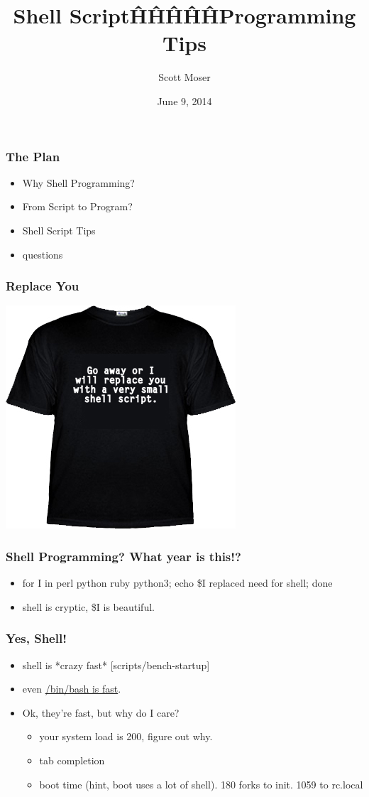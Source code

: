 \documentclass{beamer}
\author{Scott Moser}
\title{Shell Script\^H\^H\^H\^H\^HProgramming Tips}
\institute{Michigan!/usr/group}
\date{June 9, 2014}
\begin{document}
\begin{frame}[t,plain]
    \titlepage
\end{frame}

\begin{frame}
   \frametitle{The Plan}
   \begin{itemize}
      \item Why Shell Programming?
      \item From Script to Program?
      \item Shell Script Tips
      \item questions
   \end{itemize}
\end{frame}

\begin{frame}
   \frametitle{Replace You}
   \includegraphics{replace-you}
\end{frame}

\begin{frame}
   \frametitle{Shell Programming?  What year is this!?}
   \begin{itemize}
      \item for I in perl python ruby python3; echo \$I replaced need for shell; done
      \item shell is cryptic, \$I is beautiful.
   \end{itemize}
\end{frame}

\begin{frame}
   \frametitle{Yes, Shell!}
   \begin{itemize}
      \item shell is *crazy fast* [scripts/bench-startup]
      \item even \href{https://gist.github.com/smoser/9780744}{/bin/bash is fast}.
      \item Ok, they're fast, but why do I care?
      \begin{itemize}
         \item your system load is 200, figure out why.
         \item tab completion
         \item boot time (hint, boot uses a lot of shell). 180 forks to init. 1059 to rc.local
      \end{itemize}
   \end{itemize}
\end{frame}
\end{document}
